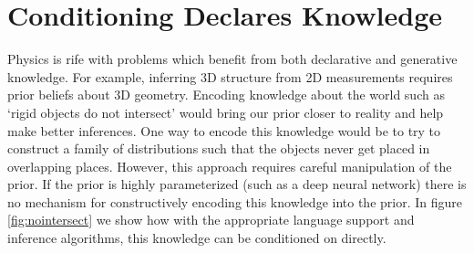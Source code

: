 
\section{Conditioning Declares Knowledge}\label{condknow}

Physics is rife with problems which benefit from both declarative and generative knowledge.
For example, inferring 3D structure from 2D measurements requires prior beliefs about 3D geometry.
Encoding knowledge about the world such as `rigid objects do not intersect' would bring our prior closer to reality and help make better inferences.  One way to encode this knowledge
would be to try to construct a family of distributions such that the objects never get placed in overlapping places. However, this approach requires careful manipulation of the prior.
If the prior is highly parameterized (such as a deep neural network) there is no mechanism for constructively encoding this knowledge into the prior.
In figure \ref{fig:nointersect} we show how with the appropriate language support and inference algorithms, this knowledge can be conditioned on directly.

